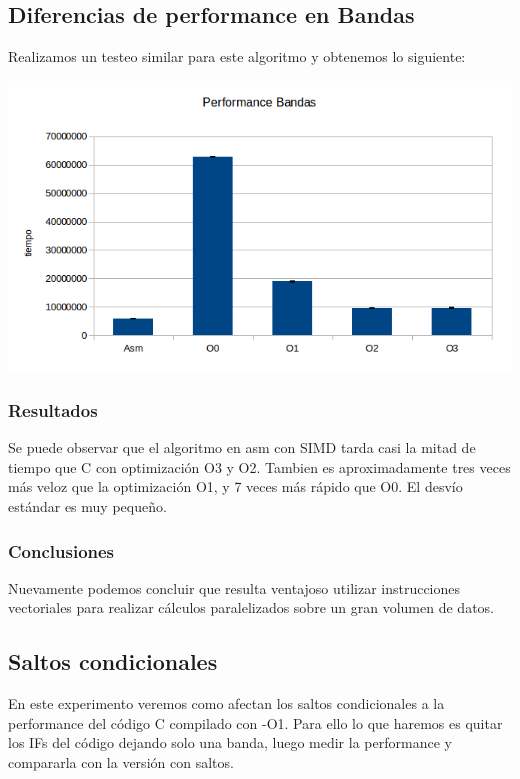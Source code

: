 \documentclass[a4paper]{article}
\begin{document}
\subsection{Diferencias de performance en Bandas}

Realizamos un testeo similar para este algoritmo y obtenemos lo siguiente:

\newpage

  \begin{center}
  \includegraphics[scale=0.66]{Graficos1.4/ban/per.jpg}
  \end{center}

\subsubsection{Resultados}
Se puede observar que el algoritmo en asm con SIMD tarda casi la mitad de tiempo que C con optimización O3 y O2. Tambien es aproximadamente tres veces más veloz que la optimización O1, y 7 veces más rápido que O0. El desvío estándar es muy pequeño.

\subsubsection{Conclusiones}

Nuevamente podemos concluir que resulta ventajoso utilizar instrucciones vectoriales para realizar cálculos paralelizados sobre un gran volumen de datos.

\newpage
\subsection{Saltos condicionales}

En este experimento veremos como afectan los saltos condicionales a la performance del código C compilado con -O1. Para ello lo que haremos es quitar los IFs del código dejando solo una banda, luego medir la performance y compararla con la versión con saltos.
\end{document}

